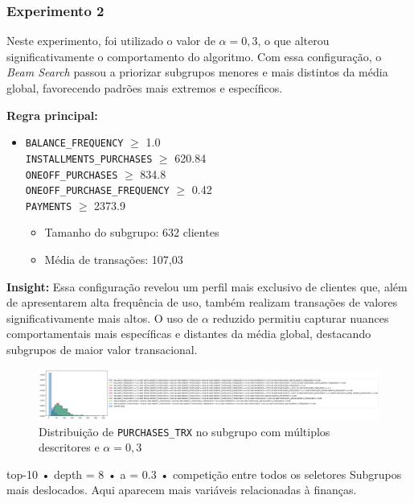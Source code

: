\documentclass[12pt]{article}
\begin{document}
\subsubsection{Experimento 2}

Neste experimento, foi utilizado o valor de $\alpha = 0{,}3$, o que alterou significativamente o comportamento do algoritmo. Com essa configuração, o \textit{Beam Search} passou a priorizar subgrupos menores e mais distintos da média global, favorecendo padrões mais extremos e específicos.

\textbf{Regra principal:}
\begin{itemize}
    \item \texttt{BALANCE\_FREQUENCY} $\geq$ 1.0 \\
          \texttt{INSTALLMENTS\_PURCHASES} $\geq$ 620.84 \\
          \texttt{ONEOFF\_PURCHASES} $\geq$ 834.8 \\
          \texttt{ONEOFF\_PURCHASE\_FREQUENCY} $\geq$ 0.42 \\
          \texttt{PAYMENTS} $\geq$ 2373.9
          \begin{itemize}
              \item Tamanho do subgrupo: 632 clientes
              \item Média de transações: 107{,}03
          \end{itemize}
\end{itemize}

\textbf{Insight:} Essa configuração revelou um perfil mais exclusivo de clientes que, além de apresentarem alta frequência de uso, também realizam transações de valores significativamente mais altos. O uso de $\alpha$ reduzido permitiu capturar nuances comportamentais mais específicas e distantes da média global, destacando subgrupos de maior valor transacional.

\begin{figure}[h]
    \centering
    \includegraphics[width=1\textwidth]{imagens/experimento2.1.png}
    \caption{Distribuição de \texttt{PURCHASES\_TRX} no subgrupo com múltiplos descritores e $\alpha = 0{,}3$}
    \label{fig:experimento2_1}
\end{figure}
top-10  •  depth = 8  •  a = 0.3  •  competição entre todos os seletores
Subgrupos mais deslocados. Aqui aparecem  mais variáveis relacionadas à finanças.
\end{document}
